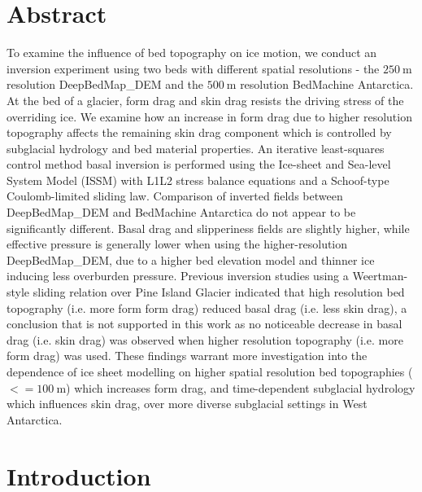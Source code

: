 
\section*{Abstract}

To examine the influence of bed topography on ice motion, we conduct an inversion experiment using two beds with different spatial resolutions - the $\SI{250}{\metre}$ resolution DeepBedMap\_DEM and the $\SI{500}{\metre}$ resolution BedMachine Antarctica.
At the bed of a glacier, form drag and skin drag resists the driving stress of the overriding ice.
We examine how an increase in form drag due to higher resolution topography affects the remaining skin drag component which is controlled by subglacial hydrology and bed material properties.
An iterative least-squares control method basal inversion is performed using the Ice-sheet and Sea-level System Model (\gls{ISSM}) with L1L2 stress balance equations and a Schoof-type Coulomb-limited sliding law.
Comparison of inverted fields between DeepBedMap\_DEM and BedMachine Antarctica do not appear to be significantly different.
Basal drag and slipperiness fields are slightly higher, while effective pressure is generally lower when using the higher-resolution DeepBedMap\_DEM, due to a higher bed elevation model and thinner ice inducing less overburden pressure.
Previous inversion studies using a Weertman-style sliding relation over Pine Island Glacier indicated that high resolution bed topography (i.e. more form form drag) reduced basal drag (i.e. less skin drag), a conclusion that is not supported in this work as no noticeable decrease in basal drag (i.e. skin drag) was observed when higher resolution topography (i.e. more form drag) was used.
These findings warrant more investigation into the dependence of ice sheet modelling on higher spatial resolution bed topographies ($<= \SI{100}{\metre}$) which increases form drag, and time-dependent subglacial hydrology which influences skin drag, over more diverse subglacial settings in West Antarctica.


\section{Introduction}

